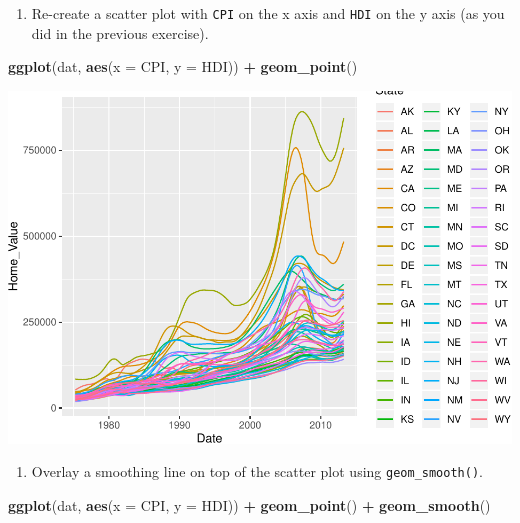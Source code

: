 \documentclass[
]{book}
\newenvironment{Shaded}{\begin{snugshade}}{\end{snugshade}}
\newcommand{\DataTypeTok}[1]{\textcolor[rgb]{0.13,0.29,0.53}{#1}}
\newcommand{\KeywordTok}[1]{\textcolor[rgb]{0.13,0.29,0.53}{\textbf{#1}}}
\newcommand{\NormalTok}[1]{#1}
\newcommand{\OperatorTok}[1]{\textcolor[rgb]{0.81,0.36,0.00}{\textbf{#1}}}
\newcommand{\StringTok}[1]{\textcolor[rgb]{0.31,0.60,0.02}{#1}}
\providecommand{\tightlist}{%
  \setlength{\itemsep}{0pt}\setlength{\parskip}{0pt}}
\begin{document}
\begin{alert}

\begin{enumerate}
\def\labelenumi{\arabic{enumi}.}
\tightlist
\item
  Re-create a scatter plot with \texttt{CPI} on the x axis and \texttt{HDI} on the y axis (as you did in the previous exercise).
\end{enumerate}

\begin{Shaded}
\begin{Highlighting}[]
\KeywordTok{ggplot}\NormalTok{(dat, }\KeywordTok{aes}\NormalTok{(}\DataTypeTok{x =}\NormalTok{ CPI, }\DataTypeTok{y =}\NormalTok{ HDI)) }\OperatorTok{+}
\StringTok{  }\KeywordTok{geom\_point}\NormalTok{()}
\end{Highlighting}
\end{Shaded}

\includegraphics{R/Rgraphics/figures/unnamed-chunk-177-1.pdf}

\begin{enumerate}
\def\labelenumi{\arabic{enumi}.}
\setcounter{enumi}{1}
\tightlist
\item
  Overlay a smoothing line on top of the scatter plot using \texttt{geom\_smooth()}.
\end{enumerate}

\begin{Shaded}
\begin{Highlighting}[]
\KeywordTok{ggplot}\NormalTok{(dat, }\KeywordTok{aes}\NormalTok{(}\DataTypeTok{x =}\NormalTok{ CPI, }\DataTypeTok{y =}\NormalTok{ HDI)) }\OperatorTok{+}
\StringTok{  }\KeywordTok{geom\_point}\NormalTok{() }\OperatorTok{+}
\StringTok{  }\KeywordTok{geom\_smooth}\NormalTok{()}
\end{Highlighting}
\end{Shaded}


\end{alert}
\end{document}
